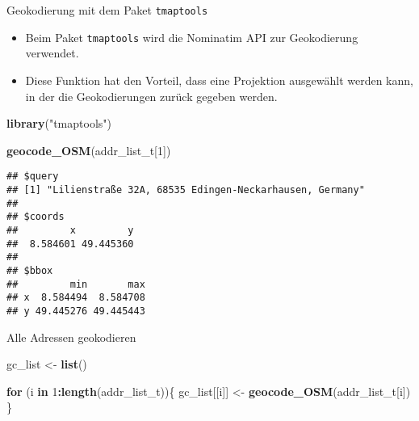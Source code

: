 \documentclass[ignorenonframetext,]{beamer}
\newenvironment{Shaded}{\begin{snugshade}}{\end{snugshade}}
\newcommand{\ControlFlowTok}[1]{\textcolor[rgb]{0.13,0.29,0.53}{\textbf{#1}}}
\newcommand{\DecValTok}[1]{\textcolor[rgb]{0.00,0.00,0.81}{#1}}
\newcommand{\KeywordTok}[1]{\textcolor[rgb]{0.13,0.29,0.53}{\textbf{#1}}}
\newcommand{\NormalTok}[1]{#1}
\newcommand{\OperatorTok}[1]{\textcolor[rgb]{0.81,0.36,0.00}{\textbf{#1}}}
\newcommand{\StringTok}[1]{\textcolor[rgb]{0.31,0.60,0.02}{#1}}
\providecommand{\tightlist}{%
  \setlength{\itemsep}{0pt}\setlength{\parskip}{0pt}}
\begin{document}
\begin{frame}[fragile]{Geokodierung mit dem Paket \texttt{tmaptools}}
\protect\hypertarget{geokodierung-mit-dem-paket-tmaptools}{}

\begin{itemize}
\tightlist
\item
  Beim Paket \texttt{tmaptools} wird die Nominatim API zur Geokodierung
  verwendet.
\item
  Diese Funktion hat den Vorteil, dass eine Projektion ausgewählt werden
  kann, in der die Geokodierungen zurück gegeben werden.
\end{itemize}

\begin{Shaded}
\begin{Highlighting}[]
\KeywordTok{library}\NormalTok{(}\StringTok{"tmaptools"}\NormalTok{)}
\end{Highlighting}
\end{Shaded}

\begin{Shaded}
\begin{Highlighting}[]
\KeywordTok{geocode_OSM}\NormalTok{(addr_list_t[}\DecValTok{1}\NormalTok{])}
\end{Highlighting}
\end{Shaded}

\begin{verbatim}
## $query
## [1] "Lilienstraße 32A, 68535 Edingen-Neckarhausen, Germany"
## 
## $coords
##         x         y 
##  8.584601 49.445360 
## 
## $bbox
##         min       max
## x  8.584494  8.584708
## y 49.445276 49.445443
\end{verbatim}

\end{frame}

\begin{frame}[fragile]{Alle Adressen geokodieren}
\protect\hypertarget{alle-adressen-geokodieren}{}

\begin{Shaded}
\begin{Highlighting}[]
\NormalTok{gc_list <-}\StringTok{ }\KeywordTok{list}\NormalTok{()}

\ControlFlowTok{for}\NormalTok{ (i }\ControlFlowTok{in} \DecValTok{1}\OperatorTok{:}\KeywordTok{length}\NormalTok{(addr_list_t))\{}
\NormalTok{  gc_list[[i]] <-}\StringTok{ }\KeywordTok{geocode_OSM}\NormalTok{(addr_list_t[i])}
\NormalTok{\}}
\end{Highlighting}
\end{Shaded}

\end{frame}
\end{document}
